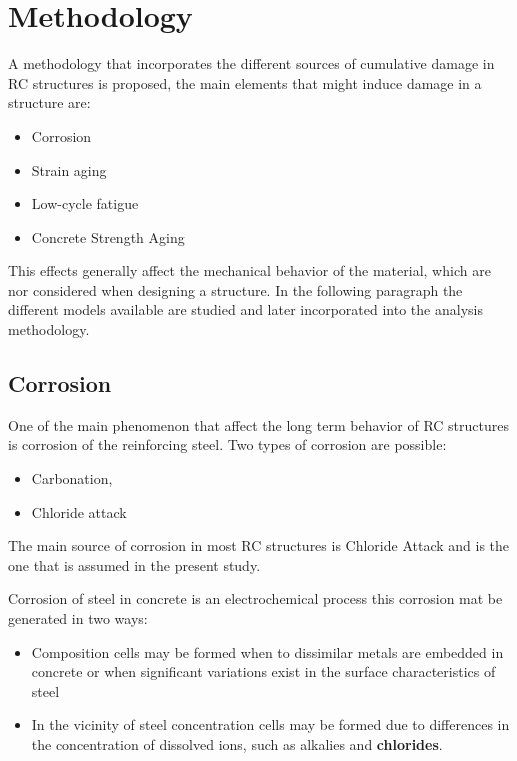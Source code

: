 \chapter{Methodology}

A methodology that incorporates the different sources of cumulative damage in RC structures is proposed, the main elements that might induce damage in a structure are:

\begin{itemize}
	\item Corrosion
	\item Strain aging
	\item Low-cycle fatigue
	\item Concrete Strength Aging
\end{itemize}

This effects generally affect the mechanical behavior of the material, which are nor considered when designing a structure. In the following paragraph the different models available are studied and later incorporated into the analysis methodology.

\section{Corrosion}

One of the main phenomenon that affect the long term behavior of RC structures is corrosion of the reinforcing steel. Two types of corrosion are possible:
\begin{itemize}
		\item Carbonation, 
		\item Chloride attack
\end{itemize}

The main source of corrosion in most RC structures is Chloride Attack and is the one that is assumed in the present study.

Corrosion of steel in concrete is an electrochemical process \cite{Mehta2014} this corrosion mat be generated in two ways:
\begin{itemize}
	\item Composition cells may be formed when to dissimilar metals are embedded in concrete or when significant variations exist in the surface characteristics of steel
	\item In the vicinity of steel concentration cells may be formed due to differences in the concentration of dissolved ions, such as alkalies and \textbf{chlorides}.
\end{itemize}

